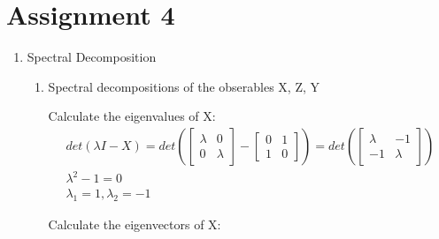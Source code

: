 \documentclass[]{article}
\begin{document}
  \section*{Assignment 4}
    \begin{enumerate}
      \item Spectral Decomposition

      \begin{enumerate}
        \item Spectral decompositions of the obserables X, Z, Y 

          Calculate the eigenvalues of X:
          \begin{gather*}
            det(\lambda I - X)=
            det(
            \begin{bmatrix}
              \lambda & 0 \\
              0 & \lambda 
            \end{bmatrix}
            - \begin{bmatrix}
              0 & 1 \\
              1 & 0
            \end{bmatrix}
            ) = det (
            \begin{bmatrix}
              \lambda & -1\\
              -1 & \lambda
            \end{bmatrix} 
            )\\
            \lambda^2 -1 = 0\\
            \lambda_1 = 1, \lambda_2 = -1
          \end{gather*}

          Calculate the eigenvectors of X:


\end{enumerate}
\end{enumerate}
\end{document}
